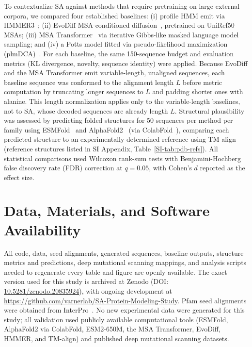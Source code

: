 \documentclass[11pt,onecolumn,twoside,lineno]{pnas-new}
\begin{document}
{To contextualize SA against methods that require pretraining on large external corpora, we compared four established baselines: (i) profile HMM emit via HMMER3~\cite{hmmer3}; (ii) EvoDiff MSA-conditioned diffusion~\cite{alamdariProteinGeneration2023}, pretrained on UniRef50 MSAs; (iii) MSA Transformer~\cite{raoMSATransformer2021} via iterative Gibbs-like masked language model sampling; and (iv) a Potts model fitted via pseudo-likelihood maximization (plmDCA)~\cite{ekeberg2013improved}. For each baseline, the same 150-sequence budget and evaluation metrics (KL divergence, novelty, sequence identity) were applied. Because EvoDiff and the MSA Transformer emit variable-length, unaligned sequences, each baseline sequence was conformed to the alignment length $L$ before metric computation by truncating longer sequences to $L$ and padding shorter ones with alanine. This length normalization applies only to the variable-length baselines, not to SA, whose decoded sequences are already length $L$. Structural plausibility was assessed by predicting folded structures for 50 sequences per method per family using ESMFold~\cite{linEvolutionaryScaleModeling2023} and AlphaFold2~\cite{jumperHighlyAccurateProtein2021} (via ColabFold~\cite{mirdita2022colabfold}), comparing each predicted structure to an experimentally determined reference using TM-align~\cite{zhangTMalign2005} (reference structures listed in SI Appendix, Table~\ref{SI-tab:pdb-refs}). All statistical comparisons used Wilcoxon rank-sum tests with Benjamini-Hochberg false discovery rate (FDR) correction at $q{=}0.05$, with Cohen's $d$ reported as the effect size.
}


\showmatmethods
\showacknow

\section*{Data, Materials, and Software Availability}
All code, data, seed alignments, generated sequences, baseline outputs, structure metrics and predictions, deep mutational scanning mappings, and analysis scripts needed to regenerate every table and figure are openly available. The exact version used for this study is archived at Zenodo (DOI: \href{https://doi.org/10.5281/zenodo.20835924}{10.5281/zenodo.20835924}), with ongoing development at \url{https://github.com/varnerlab/SA-Protein-Modeling-Study}. Pfam seed alignments were obtained from InterPro~\cite{mistryPfamProteinFamilies2021}. No new experimental data were generated for this study; all validation used publicly available computational tools (ESMFold, AlphaFold2 via ColabFold, ESM2-650M, the MSA Transformer, EvoDiff, HMMER, and TM-align) and published deep mutational scanning datasets.
\end{document}
